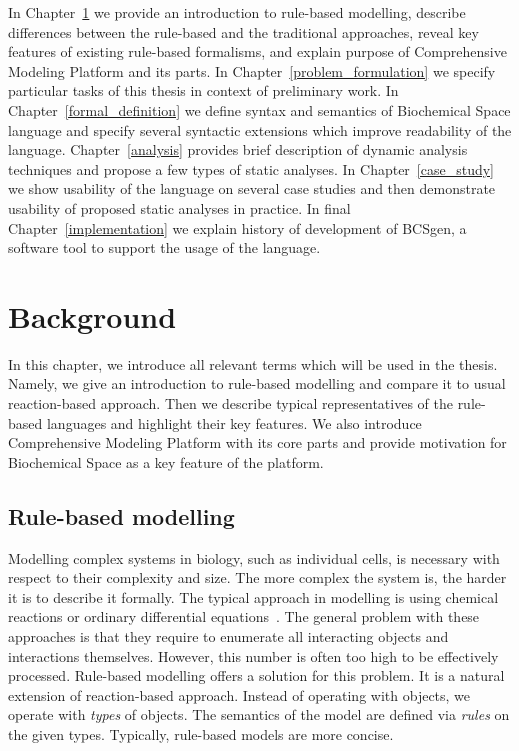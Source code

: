 \documentclass[12pt]{fithesis2}
\begin{document}
In Chapter~\ref{background} we provide an introduction to rule-based modelling, describe differences between the rule-based and the traditional approaches, reveal key features of existing rule-based formalisms, and explain purpose of Comprehensive Modeling Platform and its parts. In Chapter~\ref{problem_formulation} we specify particular tasks of this thesis in context of preliminary work. In Chapter~\ref{formal_definition} we define syntax and semantics of Biochemical Space language and specify several syntactic extensions which improve readability of the language. Chapter~\ref{analysis} provides brief description of dynamic analysis techniques and propose a few types of static analyses. In Chapter~\ref{case_study} we show usability of the language on several case studies and then demonstrate usability of proposed static analyses in practice. In final Chapter~\ref{implementation} we explain history of development of BCSgen, a software tool to support the usage of the language. 

\chapter{Background}
\label{background}

In this chapter, we introduce all relevant terms which will be used in the thesis. Namely, we give an introduction to rule-based modelling and compare it to usual reaction-based approach. Then we describe typical representatives of the rule-based languages and highlight their key features. We also introduce Comprehensive Modeling Platform with its core parts and provide motivation for Biochemical Space as a key feature of the platform.

\section{Rule-based modelling}
\label{Rule-based basics}

Modelling complex systems in biology, such as individual cells, is necessary with respect to their complexity and size. The more complex the system is, the harder it is to describe it formally. The typical approach in modelling is using chemical reactions or ordinary differential equations~\cite{coddington1955theory}. The general problem with these approaches is that they require to enumerate all interacting objects and interactions themselves. However, this number is often too high to be effectively processed. Rule-based modelling offers a solution for this problem. It is a natural extension of reaction-based approach. Instead of operating with objects, we operate with \emph{types} of objects. The semantics of the model are defined via \emph{rules} on the given types. Typically, rule-based models are more concise.
\end{document}
